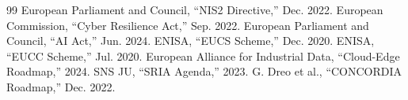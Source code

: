 \documentclass[12pt,a4paper]{article}
\begin{document}
\begin{thebibliography}{99}
 European Parliament and Council, ``NIS2 Directive,'' Dec. 2022.
 European Commission, ``Cyber Resilience Act,'' Sep. 2022.
 European Parliament and Council, ``AI Act,'' Jun. 2024.
 ENISA, ``EUCS Scheme,'' Dec. 2020.
 ENISA, ``EUCC Scheme,'' Jul. 2020.
 European Alliance for Industrial Data, ``Cloud-Edge Roadmap,'' 2024.
 SNS JU, ``SRIA Agenda,'' 2023.
 G. Dreo et al., ``CONCORDIA Roadmap,'' Dec. 2022.
\end{thebibliography}
\end{document}
